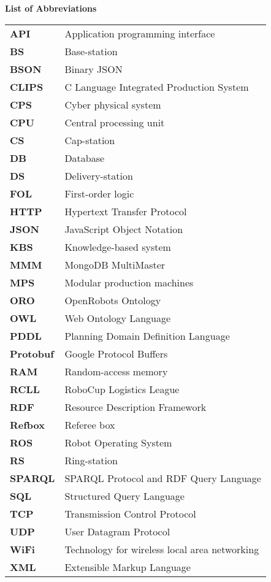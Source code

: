 \newpage

\section*{} 
\vspace{4cm}
\textbf{\noindent \Huge List of Abbreviations}
\vspace{1cm}\\
\begin{tabular}{ll}
\textbf{API} & Application programming interface \\
\textbf{BS} &  Base-station\\
\textbf{BSON} & Binary JSON \\
\textbf{CLIPS} &  C Language Integrated Production System \\
\textbf{CPS} & Cyber physical system \\
\textbf{CPU} & Central processing unit \\
\textbf{CS} &  Cap-station\\
\textbf{DB} & Database \\
\textbf{DS} &  Delivery-station\\
\textbf{FOL} & First-order logic \\
\textbf{HTTP} & Hypertext Transfer Protocol \\
\textbf{JSON} & JavaScript Object Notation \\
\textbf{KBS} & Knowledge-based system \\
\textbf{MMM} & MongoDB MultiMaster \\
\textbf{MPS} &  Modular production machines\\
\textbf{ORO} & OpenRobots Ontology \\
\textbf{OWL} & Web Ontology Language \\
\textbf{PDDL} & Planning Domain Definition Language \\
\textbf{Protobuf} &  Google Protocol Buffers\\
\textbf{RAM} & Random-access memory \\
\textbf{RCLL} & RoboCup Logistics League \\
\textbf{RDF} & Resource Description Framework \\
\textbf{Refbox} &  Referee box\\
\textbf{ROS} &  Robot Operating System\\
\textbf{RS} &  Ring-station\\
\textbf{SPARQL} & SPARQL Protocol and RDF Query Language \\
\textbf{SQL} & Structured Query Language \\
\textbf{TCP} & Transmission Control Protocol \\
\textbf{UDP} & User Datagram Protocol \\
\textbf{WiFi} & Technology for wireless local area networking \\
\textbf{XML} & Extensible Markup Language \\

\end{tabular}


